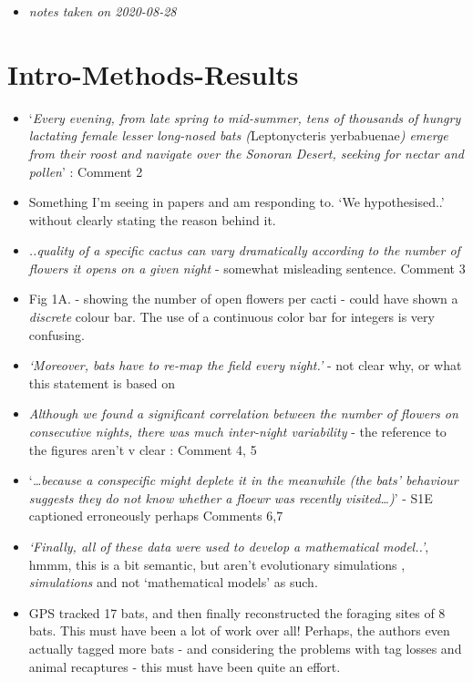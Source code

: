 \documentclass[
]{book}
\providecommand{\tightlist}{%
  \setlength{\itemsep}{0pt}\setlength{\parskip}{0pt}}
\begin{document}
\begin{itemize}
\tightlist
\item
  \emph{notes taken on 2020-08-28}
\end{itemize}

\hypertarget{intro-methods-results}{%
\section{Intro-Methods-Results}\label{intro-methods-results}}

\begin{itemize}
\item
  `\emph{Every evening, from late spring to mid-summer, tens of thousands of hungry lactating female lesser long-nosed bats (}Leptonycteris yerbabuenae\emph{) emerge from their roost and navigate over the Sonoran Desert, seeking for nectar and pollen}' : Comment 2
\item
  Something I'm seeing in papers and am responding to. `We hypothesised..' without clearly stating the reason behind it.
\item
  \emph{..quality of a specific cactus can vary dramatically according to the number of flowers it opens on a given night} - somewhat misleading sentence. Comment 3
\item
  Fig 1A. - showing the number of open flowers per cacti - could have shown a \emph{discrete} colour bar. The use of a continuous color bar for integers is very confusing.
\item
  \emph{`Moreover, bats have to re-map the field every night.'} - not clear why, or what this statement is based on
\item
  \emph{Although we found a significant correlation between the number of flowers on consecutive nights, there was much inter-night variability} - the reference to the figures aren't v clear : Comment 4, 5
\item
  `\emph{\ldots because a conspecific might deplete it in the meanwhile (the bats' behaviour suggests they do not know whether a floewr was recently visited\ldots)}' -
  S1E captioned erroneously perhaps Comments 6,7
\item
  \emph{`Finally, all of these data were used to develop a mathematical model..'}, hmmm, this is a bit semantic, but aren't evolutionary simulations , \emph{simulations} and not `mathematical models' as such.
\item
  GPS tracked 17 bats, and then finally reconstructed the foraging sites of 8 bats. This must have been a lot of work over all! Perhaps, the authors even actually tagged more bats - and considering the problems with tag losses and animal recaptures - this must have been quite an effort.

\end{itemize}
\end{document}

